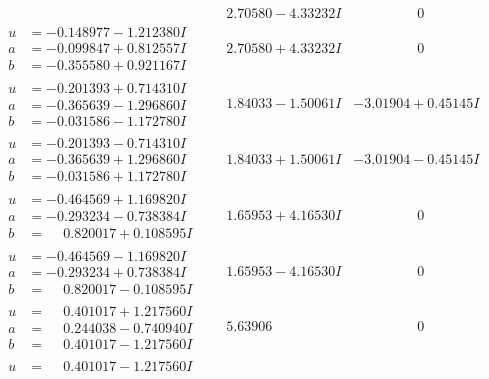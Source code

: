 \documentclass[1p]{elsarticle_modified}
\theoremstyle{definition}
\begin{document}
$$\begin{array}{c|c|c}
 & \phantom{-}2.70580 - 4.33232 I & \phantom{-0.000000 } 0 \\ \hline\begin{aligned}
u &= -0.148977 - 1.212380 I \\
a &= -0.099847 + 0.812557 I \\
b &= -0.355580 + 0.921167 I\end{aligned}
 & \phantom{-}2.70580 + 4.33232 I & \phantom{-0.000000 } 0 \\ \hline\begin{aligned}
u &= -0.201393 + 0.714310 I \\
a &= -0.365639 - 1.296860 I \\
b &= -0.031586 - 1.172780 I\end{aligned}
 & \phantom{-}1.84033 - 1.50061 I & -3.01904 + 0.45145 I \\ \hline\begin{aligned}
u &= -0.201393 - 0.714310 I \\
a &= -0.365639 + 1.296860 I \\
b &= -0.031586 + 1.172780 I\end{aligned}
 & \phantom{-}1.84033 + 1.50061 I & -3.01904 - 0.45145 I \\ \hline\begin{aligned}
u &= -0.464569 + 1.169820 I \\
a &= -0.293234 - 0.738384 I \\
b &= \phantom{-}0.820017 + 0.108595 I\end{aligned}
 & \phantom{-}1.65953 + 4.16530 I & \phantom{-0.000000 } 0 \\ \hline\begin{aligned}
u &= -0.464569 - 1.169820 I \\
a &= -0.293234 + 0.738384 I \\
b &= \phantom{-}0.820017 - 0.108595 I\end{aligned}
 & \phantom{-}1.65953 - 4.16530 I & \phantom{-0.000000 } 0 \\ \hline\begin{aligned}
u &= \phantom{-}0.401017 + 1.217560 I \\
a &= \phantom{-}0.244038 - 0.740940 I \\
b &= \phantom{-}0.401017 - 1.217560 I\end{aligned}
 & \phantom{-}5.63906\phantom{ +0.000000I} & \phantom{-0.000000 } 0 \\ \hline\begin{aligned}
u &= \phantom{-}0.401017 - 1.217560 I \\

\end{aligned}
\end{array}$$
\end{document}
